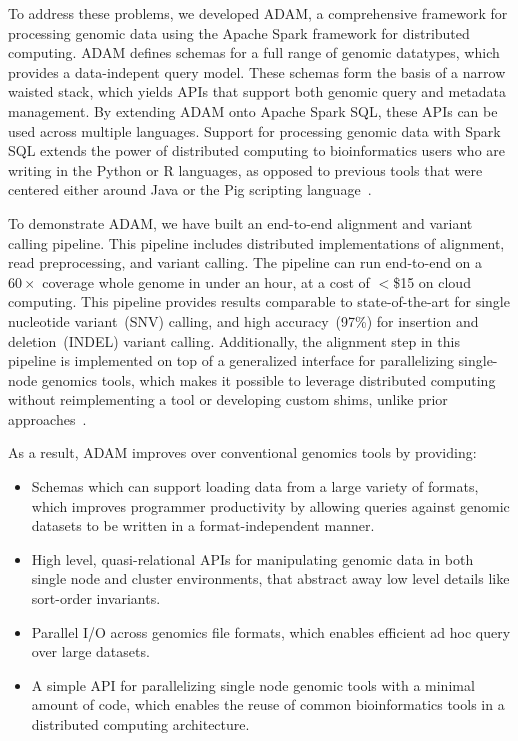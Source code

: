 \documentclass[phd]{ucbthesis}
\begin{document}
To address these problems, we developed {ADAM}, a comprehensive framework
for processing genomic data using the {Apache Spark} framework for
distributed computing. {ADAM} defines schemas for a full range of genomic
datatypes, which provides a data-indepent query model. These schemas form the
basis of a narrow waisted stack, which yields APIs that support both genomic
query and metadata management. By extending {ADAM} onto {Apache
  Spark SQL}, these APIs can be used across multiple languages. Support for
processing genomic data with {Spark SQL} extends the
power of distributed computing to bioinformatics users who are writing in the
Python or R languages, as opposed to previous tools that were centered either
around Java or the Pig scripting language~\cite{nordberg13, schumacher14}.

To demonstrate {ADAM}, we have built an end-to-end alignment and variant calling
pipeline. This pipeline includes distributed implementations of alignment, read
preprocessing, and variant calling. The pipeline can run end-to-end on a
$60\times$ coverage whole genome in under an hour, at a cost of $<$\$15 on
cloud computing. This pipeline provides results comparable to state-of-the-art
for single nucleotide variant~(SNV) calling, and high accuracy~(97\%) for
insertion and deletion~(INDEL) variant calling. Additionally, the alignment
step in this pipeline is implemented on top of a generalized interface for
parallelizing single-node genomics tools, which makes it possible to leverage
distributed computing without reimplementing a tool or developing custom shims,
unlike prior approaches~\cite{langmead09crossbow, schatz09}.

As a result, {ADAM} improves over conventional genomics tools by providing:

\begin{itemize}
\item Schemas which can support loading data from a large variety of formats,
  which improves programmer productivity by allowing queries against genomic
  datasets to be written in a format-independent manner.
\item High level, quasi-relational APIs for manipulating genomic data in both
  single node and cluster environments, that abstract away low level details
  like sort-order invariants.
\item Parallel I/O across genomics file formats, which enables efficient ad hoc
  query over large datasets.
\item A simple API for parallelizing single node genomic tools with a minimal
  amount of code, which enables the reuse of common bioinformatics tools in a
  distributed computing architecture.
\end{itemize}
\end{document}
